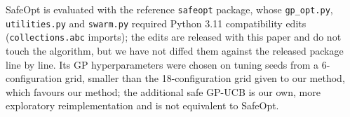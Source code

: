 SafeOpt is evaluated with the reference \texttt{safeopt} package, whose \texttt{gp\_opt.py}, \texttt{utilities.py} and \texttt{swarm.py} required Python 3.11 compatibility edits (\texttt{collections.abc} imports); the edits are released with this paper and do not touch the algorithm, but we have not diffed them against the released package line by line. Its GP hyperparameters were chosen on tuning seeds from a 6-configuration grid, smaller than the 18-configuration grid given to our method, which favours our method; the additional safe GP-UCB is our own, more exploratory reimplementation and is not equivalent to SafeOpt.